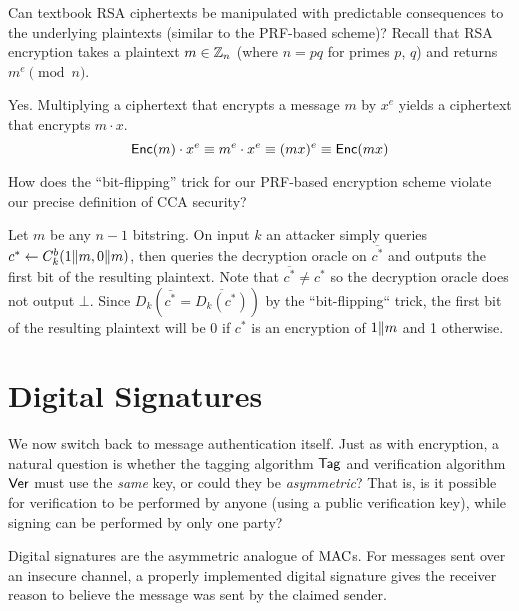 \documentclass[11pt]{article}
\begin{document}
\begin{question}
    Can textbook RSA ciphertexts be manipulated with predictable consequences to the
    underlying plaintexts (similar to the PRF-based scheme)? Recall that RSA encryption
    takes a plaintext \(m \in \mathbb{Z}_n\) (where \(n = pq\) for primes \(p\), \(q\)) and
    returns \(m^e \pmod {n}\).
\end{question}
\begin{answer}
    Yes. Multiplying a ciphertext that encrypts a message \(m\) by \(x^e\) yields a
    ciphertext that encrypts \(m \cdot x\). \[
        \mathsf{Enc}(m) \cdot x^e \equiv m^e \cdot x^e \equiv (mx)^e \equiv \mathsf{Enc}(mx)
    \]
\end{answer}

\begin{question}
    How does the ``bit-flipping'' trick for our PRF-based encryption scheme violate our
    precise definition of CCA security?
\end{question}
\begin{answer}
    Let \(m\) be any \(n-1\) bitstring. On input \(k\) an attacker simply queries
    \(c^* \gets C_k^b(1\| m, 0 \| m)\), then queries the decryption oracle on
    \(\overline{c^*}\) and outputs the first bit of the resulting plaintext. Note that
    \(\overline{c^*} \neq c^*\) so the decryption oracle does not output \(\bot\).
    Since \(D_k(\overline{c^*} = \overline{D_k(c^*)})\) by the ``bit-flipping`` trick,
    the first bit of the resulting plaintext will be 0 if \(c^*\) is an encryption of
    \(1 \| m\) and 1 otherwise.
\end{answer}

\section{Digital Signatures}
\label{sec:digital-signatures}

We now switch back to message authentication itself.  Just as with
encryption, a natural question is whether the tagging algorithm
$\mathsf{Tag}$ and verification algorithm $\mathsf{Ver}$ must use the
\emph{same} key, or could they be \emph{asymmetric}?  That is, is it
possible for verification to be performed by anyone (using a public
verification key), while signing can be performed by only one party?

Digital signatures are the asymmetric analogue of $\text{MAC}$s. For
messages sent over an insecure channel, a properly implemented digital
signature gives the receiver reason to believe the message was sent by
the claimed sender.
\end{document}

